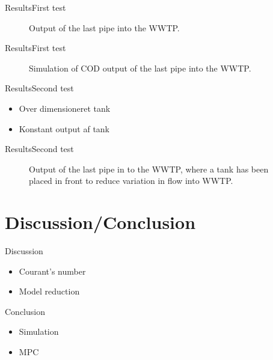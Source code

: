 \begin{frame}{Results}{First test}
 \begin{figure}[H]
\centering

\caption{Output of the last pipe into the WWTP.}
\label{fig:simulation_output_first}
\end{figure}     
\end{frame}

\begin{frame}{Results}{First test}
\begin{figure}[H]
\centering

\caption{Simulation of COD output of the last pipe into the WWTP.}
\label{fig:simulation_output_first_concentration}
\end{figure}    
\end{frame}

\begin{frame}{Results}{Second test}
    
\begin{itemize}
	\item Over dimensioneret tank
	\item Konstant output af tank
\end{itemize}

\end{frame}


\begin{frame}{Results}{Second test}
\begin{figure}[H]
\centering

\caption{Output of the last pipe in to the WWTP, where a tank has been placed in front to reduce variation in flow into WWTP.}
\label{fig:simulation_output_second}
\end{figure} 
\end{frame}


\section{Discussion/Conclusion}
\begin{frame}{Discussion}{}
\begin{itemize}
	\item Courant's number
	\item Model reduction
\end{itemize}
\end{frame}


\begin{frame}{Conclusion}{}
\begin{itemize}
    	\item Simulation
    	\item MPC
\end{itemize}    


\end{frame}
